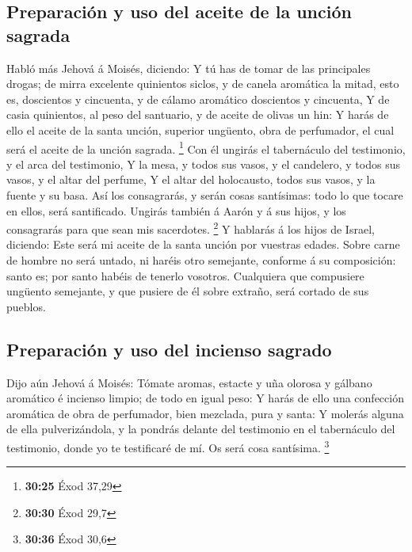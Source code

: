 \hypertarget{preparaciuxf3n-y-uso-del-aceite-de-la-unciuxf3n-sagrada}{%
\subsection{Preparación y uso del aceite de la unción
sagrada}\label{preparaciuxf3n-y-uso-del-aceite-de-la-unciuxf3n-sagrada}}

 Habló más Jehová á Moisés, diciendo:  Y tú
has de tomar de las principales drogas; de mirra excelente quinientos
siclos, y de canela aromática la mitad, esto es, doscientos y cincuenta,
y de cálamo aromático doscientos y cincuenta,  Y de casia
quinientos, al peso del santuario, y de aceite de olivas un hin:
 Y harás de ello el aceite de la santa unción, superior
ungüento, obra de perfumador, el cual será el aceite de la unción
sagrada. \footnote{\textbf{30:25} Éxod 37,29}  Con él
ungirás el tabernáculo del testimonio, y el arca del testimonio,
 Y la mesa, y todos sus vasos, y el candelero, y todos sus
vasos, y el altar del perfume,  Y el altar del holocausto,
todos sus vasos, y la fuente y su basa.  Así los
consagrarás, y serán cosas santísimas: todo lo que tocare en ellos, será
santificado.  Ungirás también á Aarón y á sus hijos, y los
consagrarás para que sean mis sacerdotes. \footnote{\textbf{30:30} Éxod
  29,7}  Y hablarás á los hijos de Israel, diciendo: Este
será mi aceite de la santa unción por vuestras edades. 
Sobre carne de hombre no será untado, ni haréis otro semejante, conforme
á su composición: santo es; por santo habéis de tenerlo vosotros.
 Cualquiera que compusiere ungüento semejante, y que
pusiere de él sobre extraño, será cortado de sus pueblos.

\hypertarget{preparaciuxf3n-y-uso-del-incienso-sagrado}{%
\subsection{Preparación y uso del incienso
sagrado}\label{preparaciuxf3n-y-uso-del-incienso-sagrado}}

 Dijo aún Jehová á Moisés: Tómate aromas, estacte y uña
olorosa y gálbano aromático é incienso limpio; de todo en igual peso:
 Y harás de ello una confección aromática de obra de
perfumador, bien mezclada, pura y santa:  Y molerás alguna
de ella pulverizándola, y la pondrás delante del testimonio en el
tabernáculo del testimonio, donde yo te testificaré de mí. Os será cosa
santísima. \footnote{\textbf{30:36} Éxod 30,6}


